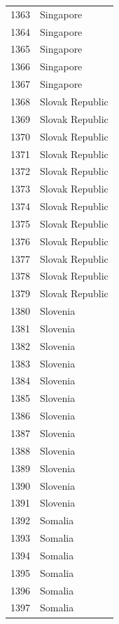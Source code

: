 \documentclass[
  letterpaper,
  DIV=11,
  numbers=noendperiod]{scrreprt}
\begin{document}
\begin{tabular}{ll}
1363 &                 Singapore \\
1364 &                 Singapore \\
1365 &                 Singapore \\
1366 &                 Singapore \\
1367 &                 Singapore \\
1368 &           Slovak Republic \\
1369 &           Slovak Republic \\
1370 &           Slovak Republic \\
1371 &           Slovak Republic \\
1372 &           Slovak Republic \\
1373 &           Slovak Republic \\
1374 &           Slovak Republic \\
1375 &           Slovak Republic \\
1376 &           Slovak Republic \\
1377 &           Slovak Republic \\
1378 &           Slovak Republic \\
1379 &           Slovak Republic \\
1380 &                  Slovenia \\
1381 &                  Slovenia \\
1382 &                  Slovenia \\
1383 &                  Slovenia \\
1384 &                  Slovenia \\
1385 &                  Slovenia \\
1386 &                  Slovenia \\
1387 &                  Slovenia \\
1388 &                  Slovenia \\
1389 &                  Slovenia \\
1390 &                  Slovenia \\
1391 &                  Slovenia \\
1392 &                   Somalia \\
1393 &                   Somalia \\
1394 &                   Somalia \\
1395 &                   Somalia \\
1396 &                   Somalia \\
1397 &                   Somalia \\

\end{tabular}
\end{document}
